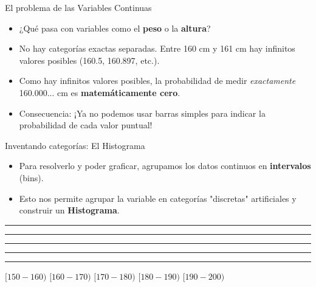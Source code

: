 \documentclass[11pt, aspectratio=169]{beamer}
\begin{document}
\begin{frame}{El problema de las Variables Continuas}
    \begin{itemize}
        \item ¿Qué pasa con variables como el \textbf{peso} o la \textbf{altura}?
        \item No hay categorías exactas separadas. Entre 160 cm y 161 cm hay infinitos valores posibles (160.5, 160.897, etc.).
        \item Como hay infinitos valores posibles, la probabilidad de medir \textit{exactamente} 160.000... cm es \textbf{matemáticamente cero}.
        \item Consecuencia: ¡Ya no podemos usar barras simples para indicar la probabilidad de cada valor puntual!
    \end{itemize}
\end{frame}

\begin{frame}{Inventando categorías: El Histograma}
    \begin{itemize}
        \item Para resolverlo y poder graficar, agrupamos los datos continuos en \textbf{intervalos} (bins).
        \item Esto nos permite agrupar la variable en categorías "discretas" artificiales y construir un \textbf{Histograma}.
    \end{itemize}
    \vspace{0.5cm}
    
    \begin{center}
        \textcolor{cyan}{\rule{1.3cm}{0.5cm}}%
        \textcolor{cyan}{\rule{1.3cm}{1.5cm}}%
        \textcolor{cyan}{\rule{1.3cm}{2.5cm}}%
        \textcolor{cyan}{\rule{1.3cm}{2.0cm}}%
        \textcolor{cyan}{\rule{1.3cm}{0.8cm}}
        
        \vspace{0.2cm}
        \small $[150-160)$ \hspace{0.1cm} $[160-170)$ \hspace{0.1cm} $[170-180)$ \hspace{0.1cm} $[180-190)$ \hspace{0.1cm} $[190-200)$
    \end{center}
\end{frame}
\end{document}
